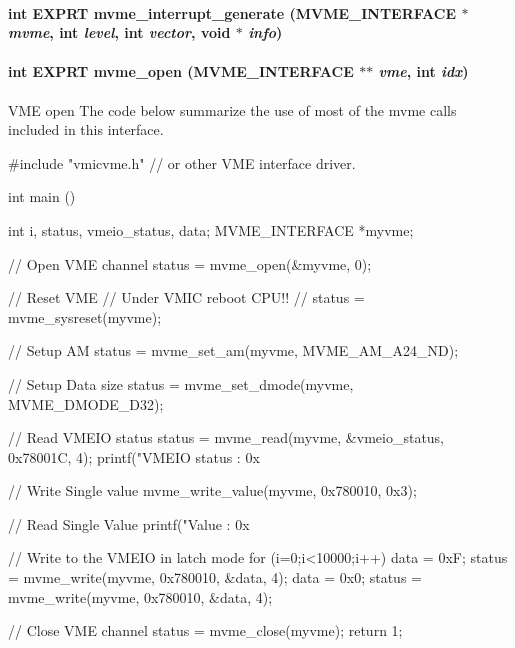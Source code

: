 \paragraph[{mvme\_\-interrupt\_\-generate}]{\setlength{\rightskip}{0pt plus 5cm}int EXPRT mvme\_\-interrupt\_\-generate ({\bf MVME\_\-INTERFACE} $\ast$ {\em mvme}, \/  int {\em level}, \/  int {\em vector}, \/  void $\ast$ {\em info})}\hfill\label{group__mvmestdfunctionh_gad5baac8397fe7332e74d5e35bc254ad9}
\paragraph[{mvme\_\-open}]{\setlength{\rightskip}{0pt plus 5cm}int EXPRT mvme\_\-open ({\bf MVME\_\-INTERFACE} $\ast$$\ast$ {\em vme}, \/  int {\em idx})}\hfill\label{group__mvmestdfunctionh_ga13db7fc7c7c022e46fadd8fc4dc40047}
VME open The code below summarize the use of most of the mvme calls included in this interface. 
\begin{DoxyCode}
#include "vmicvme.h"  // or other VME interface driver.

int main () {
  int i, status, vmeio_status, data;
  MVME_INTERFACE *myvme;

  // Open VME channel 
  status = mvme_open(&myvme, 0);

  // Reset VME 
  // Under VMIC reboot CPU!!
  //  status = mvme_sysreset(myvme);

  // Setup AM 
  status = mvme_set_am(myvme, MVME_AM_A24_ND);

  // Setup Data size 
  status = mvme_set_dmode(myvme, MVME_DMODE_D32);

  // Read VMEIO status 
  status = mvme_read(myvme, &vmeio_status, 0x78001C, 4); 
  printf("VMEIO status : 0x%

  // Write Single value 
  mvme_write_value(myvme, 0x780010, 0x3);

  // Read Single Value 
  printf("Value : 0x%

  // Write to the VMEIO in latch mode 
  for (i=0;i<10000;i++) {
    data = 0xF;
    status = mvme_write(myvme, 0x780010, &data, 4);
    data = 0x0;
    status = mvme_write(myvme, 0x780010, &data, 4);
  }

  // Close VME channel 
  status = mvme_close(myvme);
  return 1;
}
\end{DoxyCode}
 

